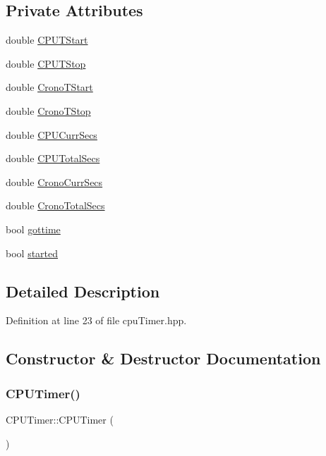 \subsection*{Private Attributes}
\begin{DoxyCompactItemize}
\item 
double \hyperlink{class_c_p_u_timer_a0248a7ebc1ed9fb9bcd4f63f07f9f984}{C\+P\+U\+T\+Start}
\item 
double \hyperlink{class_c_p_u_timer_a02e800ccdca6291ee1d00b4c805d69c1}{C\+P\+U\+T\+Stop}
\item 
double \hyperlink{class_c_p_u_timer_a097a928f647be3a1e679d702a74119ed}{Crono\+T\+Start}
\item 
double \hyperlink{class_c_p_u_timer_aaeaf8c0445112562f3b85ad93994d194}{Crono\+T\+Stop}
\item 
double \hyperlink{class_c_p_u_timer_aa34930f260364d48351fac6f5b926c82}{C\+P\+U\+Curr\+Secs}
\item 
double \hyperlink{class_c_p_u_timer_a1f61a2313ec71eb67d658c482420abe7}{C\+P\+U\+Total\+Secs}
\item 
double \hyperlink{class_c_p_u_timer_a5cd38d0e4893710f1c85f1aa03961cbc}{Crono\+Curr\+Secs}
\item 
double \hyperlink{class_c_p_u_timer_a9c8ac2ee9f44e8b4365321698cf17493}{Crono\+Total\+Secs}
\item 
bool \hyperlink{class_c_p_u_timer_ab0f086c04c1b6019db26c44db9812d80}{gottime}
\item 
bool \hyperlink{class_c_p_u_timer_a8fde2f68dd2f4811400429dcf9a4a6c7}{started}
\end{DoxyCompactItemize}


\subsection{Detailed Description}


Definition at line 23 of file cpu\+Timer.\+hpp.



\subsection{Constructor \& Destructor Documentation}
\mbox{\label{class_c_p_u_timer_aa06f8e13b3c82bbb8642f4981bfff7e7}} 
\subsubsection{\texorpdfstring{C\+P\+U\+Timer()}{CPUTimer()}}
{\footnotesize\ttfamily C\+P\+U\+Timer\+::\+C\+P\+U\+Timer (\begin{DoxyParamCaption}{ }\end{DoxyParamCaption})}



